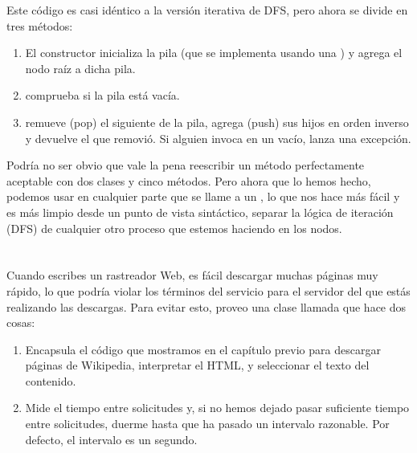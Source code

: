 \documentclass[12pt]{book}
\theoremstyle{exercise}
\begin{document}

Este código es casi idéntico a la versión iterativa de DFS, pero ahora
se divide en tres métodos:

\begin{enumerate}

\item
  El constructor inicializa la pila (que se implementa usando una
  ) y agrega el nodo raíz a dicha pila.

\item
   comprueba si la pila está vacía.

\item
   remueve (pop) el siguiente  de la pila, agrega (push) sus
  hijos en orden inverso y devuelve el  que removió. Si
  alguien invoca  en un  vacío, lanza
  una excepción.

\end{enumerate}

Podría no ser obvio que vale la pena reescribir un método perfectamente
aceptable con dos clases y cinco métodos. Pero ahora que lo hemos
hecho, podemos usar  en cualquier parte que
se llame a un , lo que nos hace más fácil y es más limpio desde
un punto de vista sintáctico, separar la lógica de iteración (DFS) de cualquier
otro proceso que estemos haciendo en los nodos.



\section{}
\label{wikifetcher}


Cuando escribes un rastreador Web, es fácil descargar muchas páginas muy
rápido, lo que podría violar los términos del servicio para el servidor
del que estás realizando las descargas. Para evitar esto, proveo una clase
llamada  que hace dos cosas:

\begin{enumerate}

\item
  Encapsula el código que mostramos en el capítulo previo para descargar
  páginas de Wikipedia, interpretar el HTML, y seleccionar el texto
  del contenido.

\item
  Mide el tiempo entre solicitudes y, si no hemos dejado pasar suficiente
  tiempo entre solicitudes, duerme hasta que ha pasado un intervalo
  razonable. Por defecto, el intervalo es un segundo.

\end{enumerate}
\end{document}

